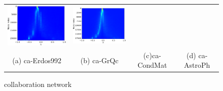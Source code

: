 \documentclass[senior,final,11pt]{iscs-thesis}
\begin{document}
\begin{figure}[htbp]
\begin{tabular}{cccc}
    \includegraphics[width=45mm]{figure/ca-CondMatmtx_pdos.png} &
    \includegraphics[width=45mm]{figure/ca-AstroPhmtx_pdos.png} \\
    (a) ca-Erdos992 & (b) ca-GrQc & (c)ca-CondMat  & (d) ca-AstroPh\\ [6pt]
  \end{tabular}
  \caption{collaboration network}
  \label{fig:collaboration }
\end{figure}
\end{document}
